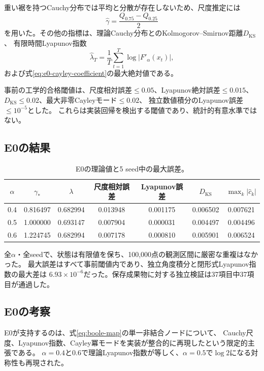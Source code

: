 \documentclass[a4paper,11pt]{jlreq}
\begin{document}
重い裾を持つCauchy分布では平均と分散が存在しないため、尺度推定には
\begin{equation}
    \widehat\gamma
    =\frac{Q_{0.75}-Q_{0.25}}{2}
    \label{eq:robust-scale}
\end{equation}
を用いた。その他の指標は、理論Cauchy分布とのKolmogorov--Smirnov距離$D_{\mathrm{KS}}$、
有限時間Lyapunov指数
\begin{equation}
    \widehat\lambda_T
    =\frac{1}{T}\sum_{t=1}^{T}\log\left|F'_{\alpha}(x_t)\right|,
\end{equation}
および式\eqref{eq:e0-cayley-coefficient}の最大絶対値である。

事前の工学的合格閾値は、尺度相対誤差$\le 0.05$、Lyapunov絶対誤差$\le 0.015$、
$D_{\mathrm{KS}}\le 0.02$、最大非零Cayleyモード$\le 0.02$、
独立数値積分のLyapunov誤差$\le 10^{-5}$とした。
これらは実装回帰を検出する閾値であり、統計的有意水準ではない。

\subsection{E0の結果}

\begin{table}[htbp]
\centering
\small
\caption{E0の理論値と5 seed中の最大誤差。}
\label{tab:e0-results}
\begin{tabular}{ccccccc}
\toprule
$\alpha$ & $\gamma_{\ast}$ & $\lambda$ & 尺度相対誤差 & Lyapunov誤差 & $D_{\mathrm{KS}}$ & $\max_{k}|\widehat c_k|$ \\
\midrule
0.4 & 0.816497 & 0.682994 & 0.013948 & 0.001175 & 0.006502 & 0.007621 \\
0.5 & 1.000000 & 0.693147 & 0.007904 & 0.000031 & 0.004497 & 0.004496 \\
0.6 & 1.224745 & 0.682994 & 0.007178 & 0.000810 & 0.005901 & 0.006524 \\
\bottomrule
\end{tabular}
\end{table}

全$\alpha$・全seedで、状態は有限値を保ち、100,000点の観測区間に厳密な重複はなかった。
最大誤差はすべて事前閾値内であり、独立角度積分と閉形式Lyapunov指数の最大差は
$6.93\times10^{-6}$だった。保存成果物に対する独立検証は37項目中37項目が通過した。

\subsection{E0の考察}

E0が支持するのは、式\eqref{eq:boole-map}の単一非結合ノードについて、
Cauchy尺度、Lyapunov指数、Cayley冪モードを実装が整合的に再現したという限定的主張である。
$\alpha=0.4$と$0.6$で理論Lyapunov指数が等しく、$\alpha=0.5$で$\log2$になる対称性も再現された。
\end{document}
